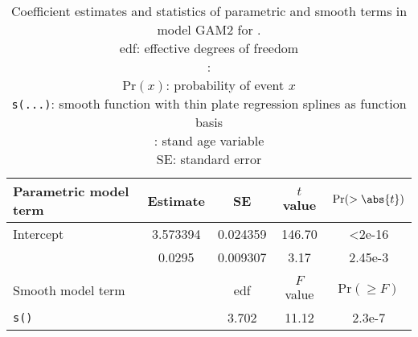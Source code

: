 \begin{singlespace}
  \begin{table}[h]
    \caption{Coefficient estimates and statistics of parametric and smooth terms in model GAM2 for \Beech{}. \\
      edf: effective degrees of freedom \\
      \texttt{\ProductivityIndexVariableR{}}: \ProductivityIndexVariableText{} \\
      \(\text{Pr}(x)\): probability of event \(x\) \\
      \texttt{s(...)}: smooth function with thin plate regression splines as function basis \\
      \texttt{\StandAgeVariableR{}}: stand age variable \\
      SE: standard error}
    \label{tab:StatisticsGAM1Beech}
    {\tabulinesep=2mm
      \begin{tabu}{L
          S[table-format = 1.6]
          S[table-format = 1.6]
          S[table-format = 3.2]
          S[table-format = 1.2e-2, table-comparator = true]
        }
        \toprule
        Parametric model term & {Estimate} & {SE} & {\(t\) value} & {\(\text{Pr}(> \abs{t})\)} \\
        \midrule
        Intercept & 3.573394 & 0.024359 & 146.70 & <2e-16 \\
        \texttt{\ProductivityIndexVariableR{}} & 0.0295 & 0.009307 & 3.17 & 2.45e-3 \\
        \\
        Smooth model term &  & {edf} & {\(F\) value} & {\(\text{Pr}(\geq F)\)} \\
        \midrule
        \texttt{s(\StandAgeVariableR{})} & & 3.702 & 11.12 & 2.3e-7 \\
        \bottomrule
      \end{tabu}
    }
  \end{table}
\end{singlespace}


